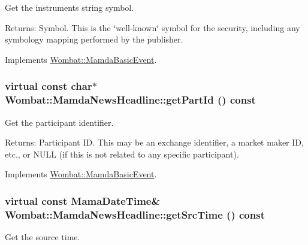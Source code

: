 Get the instruments string symbol. 

\begin{Desc}
\item[Returns:]Symbol. This is the \char`\"{}well-known\char`\"{} symbol for the security, including any symbology mapping performed by the publisher. \end{Desc}


Implements \hyperlink{classWombat_1_1MamdaBasicEvent_8783b136a1305d21c578ced8618c090b}{Wombat::Mamda\-Basic\-Event}.\hypertarget{classWombat_1_1MamdaNewsHeadline_5c2e3274fa3d55033e98b2e2e45602d7}{
\subsubsection[getPartId]{\setlength{\rightskip}{0pt plus 5cm}virtual const char$\ast$ Wombat::Mamda\-News\-Headline::get\-Part\-Id () const}}
\label{classWombat_1_1MamdaNewsHeadline_5c2e3274fa3d55033e98b2e2e45602d7}


Get the participant identifier. 

\begin{Desc}
\item[Returns:]Participant ID. This may be an exchange identifier, a market maker ID, etc., or NULL (if this is not related to any specific participant). \end{Desc}


Implements \hyperlink{classWombat_1_1MamdaBasicEvent_94e531c6ae9ae7798725db14facbd6e2}{Wombat::Mamda\-Basic\-Event}.\hypertarget{classWombat_1_1MamdaNewsHeadline_e60a4e0f0d97fa42880b4def483b92f9}{
\subsubsection[getSrcTime]{\setlength{\rightskip}{0pt plus 5cm}virtual const Mama\-Date\-Time\& Wombat::Mamda\-News\-Headline::get\-Src\-Time () const}}
\label{classWombat_1_1MamdaNewsHeadline_e60a4e0f0d97fa42880b4def483b92f9}


Get the source time. 

